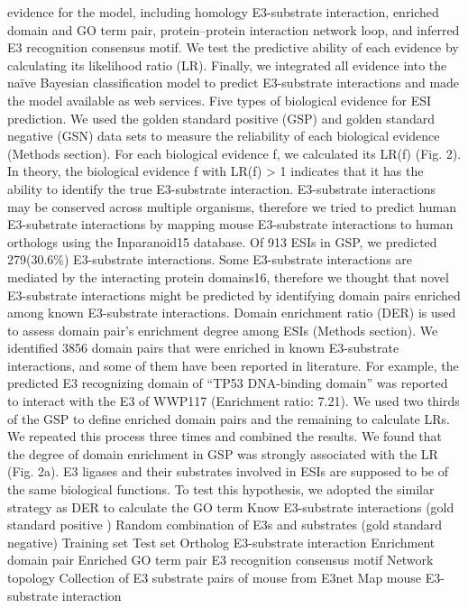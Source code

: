 evidence
for
the
model,
including
homology
E3-substrate
interaction,
enriched
domain
and
GO
term
pair,
protein–protein interaction network loop, and inferred E3
recognition consensus motif. We test the predictive ability of each
evidence by calculating its likelihood ratio (LR). Finally, we
integrated all evidence into the naïve Bayesian classiﬁcation
model to predict E3-substrate interactions and made the model
available as web services.
Five types of biological evidence for ESI prediction. We used
the golden standard positive (GSP) and golden standard negative
(GSN) data sets to measure the reliability of each biological
evidence (Methods section). For each biological evidence f, we
calculated its LR(f) (Fig. 2). In theory, the biological evidence f
with LR(f) > 1 indicates that it has the ability to identify the true
E3-substrate interaction.
E3-substrate interactions may be conserved across multiple
organisms, therefore we tried to predict human E3-substrate
interactions by mapping mouse E3-substrate interactions to
human orthologs using the Inparanoid15 database. Of 913 ESIs in
GSP, we predicted 279(30.6\%) E3-substrate interactions.
Some E3-substrate interactions are mediated by the interacting
protein domains16, therefore we thought that novel E3-substrate
interactions might be predicted by identifying domain pairs
enriched
among
known
E3-substrate
interactions.
Domain
enrichment ratio (DER) is used to assess domain pair’s
enrichment degree among ESIs (Methods section). We identiﬁed
3856 domain pairs that were enriched in known E3-substrate
interactions, and some of them have been reported in literature.
For example, the predicted E3 recognizing domain of “TP53
DNA-binding domain” was reported to interact with the E3 of
WWP117 (Enrichment ratio: 7.21). We used two thirds of the
GSP to deﬁne enriched domain pairs and the remaining to
calculate LRs. We repeated this process three times and combined
the results. We found that the degree of domain enrichment in
GSP was strongly associated with the LR (Fig. 2a).
E3 ligases and their substrates involved in ESIs are supposed to
be of the same biological functions. To test this hypothesis, we
adopted the similar strategy as DER to calculate the GO term
Know E3-substrate interactions
(gold standard positive )
Random combination of E3s and
substrates (gold standard negative)
Training set
Test set
Ortholog E3-substrate interaction
Enrichment domain pair
Enriched GO term pair
E3 recognition consensus motif
Network topology
Collection of E3 substrate pairs of
mouse from E3net
Map mouse E3-substrate interaction
